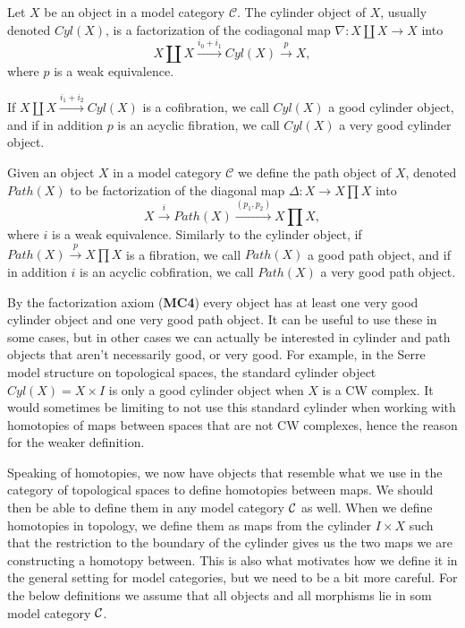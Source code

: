 \begin{definition}
\label{def:cylinder_object}
Let $X$ be an object in a model category $\mathcal{C}$. The cylinder object of $X$, usually denoted $Cyl(X)$, is a factorization of the codiagonal map $\nabla: X\coprod X\longrightarrow X$ into
\begin{equation*}
    X\coprod X\overset{i_0+i_1}\longrightarrow Cyl(X) \overset{p}\longrightarrow X,
\end{equation*} 
where $p$ is a weak equivalence. 

If $X\coprod X\overset{i_1 + i_2}\rightarrow Cyl(X)$ is a cofibration, we call $Cyl(X)$ a good cylinder object, and if in addition $p$ is an acyclic fibration, we call $Cyl(X)$ a very good cylinder object.
\end{definition}

\begin{definition}
\label{def:path_object}
Given an object $X$ in a model category $\mathcal{C}$ we define the path object of $X$, denoted $Path(X)$ to be factorization of the diagonal map $\Delta\colon X \rightarrow X\prod X$ into
\begin{equation*}
     X \overset{i}\rightarrow Path(X) \overset{(p_1,p_2)}\rightarrow X \prod X,
\end{equation*}
where $i$ is a weak equivalence. Similarly to the cylinder object, if $Path(X)\overset{p}\rightarrow X\prod X$ is a fibration, we call $Path(X)$ a good path object, and if in addition $i$ is an acyclic cobfiration, we call $Path(X)$ a very good path object.
\end{definition}

By the factorization axiom (\textbf{MC4}) every object has at least one very good cylinder object and one very good path object. It can be useful to use these in some cases, but in other cases we can actually be interested in cylinder and path objects that aren't necessarily good, or very good. For example, in the Serre model structure on topological spaces, the standard cylinder object $Cyl(X)=X\times I$ is only a good cylinder object when $X$ is a CW complex. It would sometimes be limiting to not use this standard cylinder when working with homotopies of maps between spaces that are not CW complexes, hence the reason for the weaker definition. 

Speaking of homotopies, we now have objects that resemble what we use in the category of topological spaces to define homotopies between maps. We should then be able to define them in any model category $\mathcal{C}$ as well. When we define homotopies in topology, we define them as maps from the cylinder $I\times X$ such that the restriction to the boundary of the cylinder gives us the two maps we are constructing a homotopy between. This is also what motivates how we define it in the general setting for model categories, but we need to be a bit more careful. For the below definitions we assume that all objects and all morphisms lie in som model category $\mathcal{C}$.


